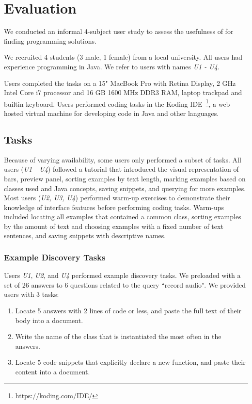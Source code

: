 \section{Evaluation}

We conducted an informal 4-subject user study to assess the usefulness of \systemname{} for finding programming solutions.

We recruited 4 students (3 male, 1 female) from a local university.
All users had experience programming in Java.
We refer to users with names \emph{U1 - U4}.

Users completed the tasks on a 15" MacBook Pro with Retina Display, 2 GHz Intel Core i7 processor and 16 GB 1600 MHz DDR3 RAM, laptop trackpad and builtin keyboard.
Users performed coding tasks in the Koding IDE~\footnote{https://koding.com/IDE/}, a web-hosted virtual machine for developing code in Java and other languages.

\subsection{Tasks}

Because of varying availability, some users only performed a subset of tasks.
All users (\emph{U1 - U4}) followed a tutorial that introduced the visual representation of bars, preview panel, sorting examples by text length, marking examples based on classes used and Java concepts, saving snippets, and querying for more examples.
Most users (\emph{U2, U3, U4}) performed warm-up exercises to demonstrate their knowledge of interface features before performing coding tasks.
Warm-ups included locating all examples that contained a common class, sorting examples by the amount of text and choosing examples with a fixed number of text sentences, and saving snippets with descriptive names.

\subsubsection{Example Discovery Tasks}

Users \emph{U1}, \emph{U2}, and \emph{U4} performed example discovery tasks.
We preloaded \systemname{} with a set of 26 answers to 6 questions related to the query ``record audio".
We provided users with 3 tasks:
\begin{enumerate}[noitemsep]
\item Locate 5 answers with 2 lines of code or less, and paste the full text of their body into a document.
\item Write the name of the class that is instantiated the most often in the answers.
\item Locate 5 code snippets that explicitly declare a new function, and paste their content into a document.
\end{enumerate}

